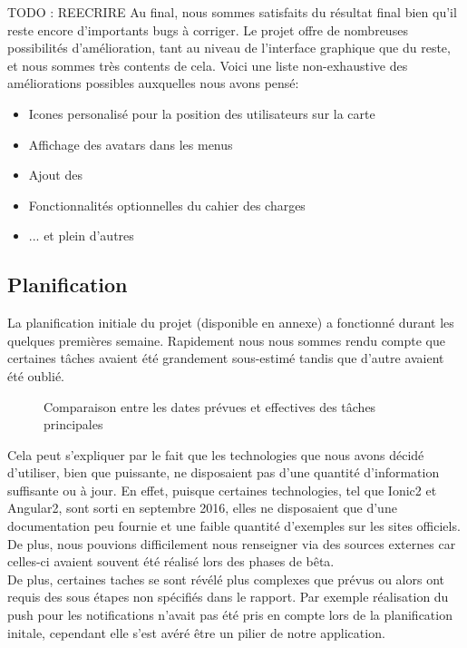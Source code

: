 \documentclass[french]{article}
\begin{document}
		TODO : REECRIRE
		Au final, nous sommes satisfaits du résultat final bien qu'il reste encore d'importants bugs à corriger. Le projet offre de nombreuses possibilités d'amélioration, tant au niveau de l'interface graphique que du reste, et nous sommes très contents de cela. Voici une liste non-exhaustive des améliorations possibles auxquelles nous avons pensé:
		\begin{itemize}
			\item Icones personalisé pour la position des utilisateurs sur la carte
			\item Affichage des avatars dans les menus
			\item Ajout des 
			\item Fonctionnalités optionnelles du cahier des charges
			\item ... et plein d'autres
		\end{itemize}
		
		\subsection{Planification}
		
		La planification initiale du projet (disponible en annexe) a fonctionné durant les quelques premières semaine. Rapidement nous nous sommes rendu compte que certaines tâches avaient été grandement sous-estimé tandis que d'autre avaient été oublié.
		\begin{figure}[H]
			
			\caption{Comparaison entre les dates prévues et effectives des tâches principales}
			\label{fig:comparaisondates}
		\end{figure}
		Cela peut s'expliquer par le fait que les technologies que nous avons décidé d'utiliser, bien que puissante, ne disposaient pas d'une quantité d'information suffisante ou à jour. En effet, puisque certaines technologies, tel que Ionic2 et Angular2, sont sorti en septembre 2016, elles ne disposaient que d'une documentation peu fournie et une faible quantité d'exemples sur les sites officiels. De plus, nous pouvions difficilement nous renseigner via des sources externes car celles-ci avaient souvent été réalisé lors des phases de bêta. \\ 
		
		De plus, certaines taches se sont révélé plus complexes que prévus ou alors ont requis des sous étapes non spécifiés dans le rapport. Par exemple réalisation du push pour les notifications n'avait pas été pris en compte lors de la planification initale, cependant elle s'est avéré être un pilier de notre application.
		
\end{document}
